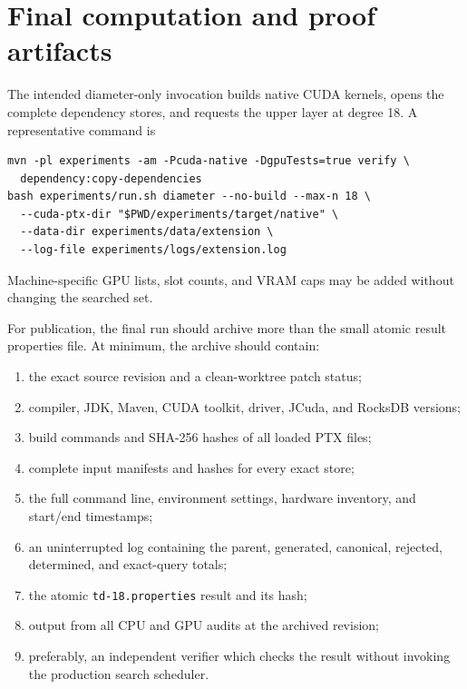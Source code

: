 \documentclass[11pt]{article}
\theoremstyle{definition}
\theoremstyle{remark}
\newcommand{\code}[1]{\texttt{#1}}
\begin{document}
\section{Final computation and proof artifacts}
\label{sec:certificate}

The intended diameter-only invocation builds native CUDA kernels, opens the
complete dependency stores, and requests the upper layer at degree 18.  A
representative command is
\begin{verbatim}
mvn -pl experiments -am -Pcuda-native -DgpuTests=true verify \
  dependency:copy-dependencies
bash experiments/run.sh diameter --no-build --max-n 18 \
  --cuda-ptx-dir "$PWD/experiments/target/native" \
  --data-dir experiments/data/extension \
  --log-file experiments/logs/extension.log
\end{verbatim}
Machine-specific GPU lists, slot counts, and VRAM caps may be added without
changing the searched set.

For publication, the final run should archive more than the small atomic
result properties file.  At minimum, the archive should contain:
\begin{enumerate}
  \item the exact source revision and a clean-worktree patch status;
  \item compiler, JDK, Maven, CUDA toolkit, driver, JCuda, and RocksDB versions;
  \item build commands and SHA-256 hashes of all loaded PTX files;
  \item complete input manifests and hashes for every exact store;
  \item the full command line, environment settings, hardware inventory, and
    start/end timestamps;
  \item an uninterrupted log containing the parent, generated, canonical,
    rejected, determined, and exact-query totals;
  \item the atomic \code{td-18.properties} result and its hash;
  \item output from all CPU and GPU audits at the archived revision;
  \item preferably, an independent verifier which checks the result without
    invoking the production search scheduler.
\end{enumerate}
\end{document}

